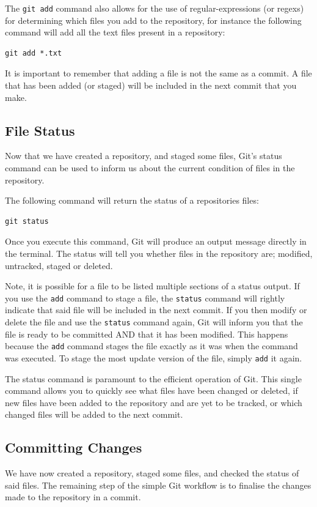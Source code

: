 \documentclass[11pt, a4paper, titlepage]{article}
\begin{document}
The {\tt git add} command also allows for the use of regular-expressions (or
regexs) for determining which files you add to the repository, for instance the
following command will add all the text files present in a repository:
\begin{lstlisting}[label=lst_add_regex,
caption=Adding all files ending with .txt file etension.]
 git add *.txt
\end{lstlisting}
It is important to remember that adding a file is not the same as a commit.
A file that has been added (or staged) will be included in the next commit
that you make.


\subsection{File Status}
Now that we have created a repository, and staged some files, Git's status
command can be used to inform us about the current condition of files in the
repository.  

The following command will return the status of a repositories files:
\begin{lstlisting}[label=lst_status,
caption=Initialisin a new Git repository]
 git status
\end{lstlisting}
Once you execute this command, Git will produce an output message directly in
the terminal.
The status will tell you whether files in the repository are; modified,
untracked, staged or deleted.

Note, it is possible for a file to be listed multiple sections of a status
output.
If you use the {\tt add} command to stage a file, the {\tt status} command
will rightly indicate that said file will be included in the next commit.
If you then modify or delete the file and use the {\tt status} command again,
Git will inform you that the file is ready to be committed AND that it has been
modified.
This happens because the {\tt add} command stages the file exactly as it was
when the command was executed.
To stage the most update version of the file, simply {\tt add} it again.

The status command is paramount to the efficient operation of Git.
This single command allows you to quickly see what files have been changed or
deleted, if new files have been added to the repository and are yet to be
tracked, or which changed files will be added to the next commit.



\subsection{Committing Changes}
We have now created a repository, staged some files, and checked the status of
said files.
The remaining step of the simple Git workflow is to finalise the changes made
to the repository in a commit.
\end{document}
